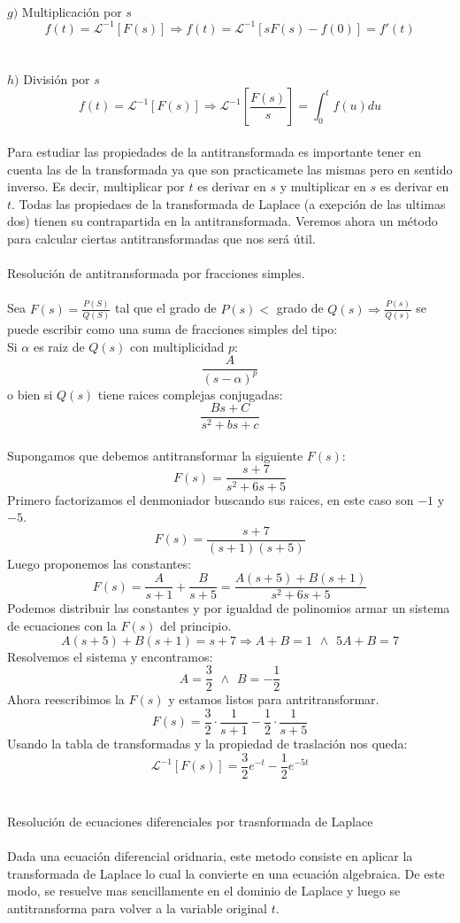 \documentclass[]{article}
\begin{document}
\\
$g)$ Multiplicación por $s$
$$
f(t) = \mathscr{L}^{-1}[F(s)] \Rightarrow f(t) = \mathscr{L}^{-1}[sF(s)-f(0)] = f'(t) 
$$
\\
\\
$h)$ División por $s$
$$
f(t) = \mathscr{L}^{-1}[F(s)] \Rightarrow \mathscr{L}^{-1}[\frac{F(s)}{s}] = \int_0^{t} f(u)du
$$
\\
Para estudiar las propiedades de la antitransformada es importante tener en cuenta las de la transformada ya que son practicamete las mismas pero en sentido inverso. Es decir, multiplicar por $t$ es derivar en $s$ y multiplicar en $s$ es derivar en $t$. Todas las propiedaes de la transformada de Laplace (a exepción de las ultimas dos) tienen su contrapartida en la antitransformada. Veremos ahora un método para calcular ciertas antitransformadas que nos será útil.
\\
\\
\Large Resolución de antitransformada por fracciones simples.
\normalsize
\\
\\
Sea $F(s) = \frac{P(S)}{Q(S)}$ tal que el grado de $P(s) <$ grado de  $Q(s) \Rightarrow \frac{P(s)}{Q(s)}$ se puede escribir como una suma de fracciones simples del tipo:
\\Si $\alpha$ es raiz de $Q(s)$ con multiplicidad $p$:
$$ 
\frac{A}{(s-\alpha)^{p}}
$$
o bien si $Q(s)$ tiene raices complejas conjugadas:
$$
\frac{Bs+C}{s^{2}+bs+c}
$$
\\
Supongamos que debemos antitransformar la siguiente $F(s)$:
$$
F(s) = \frac{s+7}{s^{2}+6s+5}
$$
Primero factorizamos el denmoniador buscando sus raices, en este caso son $-1$ y $-5$.
$$
F(s) = \frac{s+7}{(s+1)(s+5)}
$$
Luego proponemos las constantes:
$$
F(s) = \frac{A}{s+1} + \frac{B}{s+5} = \frac{A(s+5)+B(s+1)}{s^{2}+6s+5}
$$
Podemos distribuir las constantes y por igualdad de polinomios armar un sistema de ecuaciones con la $F(s)$ del principio.
$$
A(s+5)+B(s+1) = s+7 \Rightarrow A+B = 1 \hspace{5pt} \wedge \hspace{5pt} 5A+B=7
$$
Resolvemos el sistema y encontramos:
$$
A = \frac{3}{2} \hspace{5pt} \wedge \hspace{5pt} B= -\frac{1}{2}
$$
Ahora reescribimos la $F(s)$ y estamos listos para antritransformar.
$$
F(s) = \frac{3}{2} \cdot\frac{1}{s+1} - \frac{1}{2} \cdot \frac{1}{s+5}
$$
Usando la tabla de transformadas y la propiedad de traslación nos queda:
$$
\mathscr{L}^{-1}[F(s)]  = \frac{3}{2} e^{-t} - \frac{1}{2} e^{-5t}
$$
\\
\\
\Large Resolución de ecuaciones diferenciales por trasnformada de Laplace
\normalsize
\\
\\
Dada una ecuación diferencial oridnaria, este metodo consiste en aplicar la transformada de Laplace lo cual la convierte en una ecuación algebraica. De este modo, se resuelve mas sencillamente en el dominio de Laplace y luego se antitransforma para volver a la variable original $t$.
\end{document}
